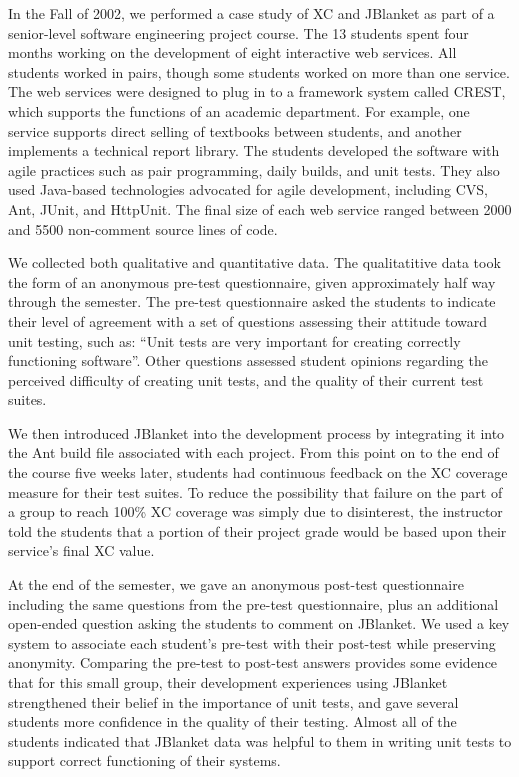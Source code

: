\documentclass[10pt,twocolumn]{article}
\begin{document}
\label{sec:Classroom}

In the Fall of 2002, we performed a case study of XC and JBlanket as part
of a senior-level software engineering project course.  The 13 students
spent four months working on the development of eight interactive web
services. All students worked in pairs, though some students worked on more
than one service. The web services were designed to plug in to a framework
system called CREST, which supports the functions of an academic
department. For example, one service supports direct selling of textbooks
between students, and another implements a technical report library.  The
students developed the software with agile practices such as pair
programming, daily builds, and unit tests. They also used Java-based
technologies advocated for agile development, including CVS, Ant, JUnit,
and HttpUnit. The final size of each web service ranged between 2000 and
5500 non-comment source lines of code.

We collected both qualitative and quantitative data.  The qualitatitive
data took the form of an anonymous pre-test questionnaire, given approximately half
way through the semester.  The pre-test questionnaire asked the students to
indicate their level of agreement with a set of questions assessing their
attitude toward unit testing, such as: ``Unit tests are very important for
creating correctly functioning software''.  Other questions assessed
student opinions regarding the perceived difficulty of creating unit tests,
and the quality of their current test suites.

We then introduced JBlanket into the development process by integrating it
into the Ant build file associated with each project. From this point on to
the end of the course five weeks later, students had continuous feedback on
the XC coverage measure for their test suites.  To reduce the possibility
that failure on the part of a group to reach 100\% XC coverage was simply
due to disinterest, the instructor told the students that a portion of
their project grade would be based upon their service's final XC value.

At the end of the semester, we gave an anonymous post-test questionnaire
including the same questions from the pre-test questionnaire, plus an
additional open-ended question asking the students to comment on
JBlanket. We used a key system to associate each student's pre-test with
their post-test while preserving anonymity.  Comparing the pre-test to
post-test answers provides some evidence that for this small group, their
development experiences using JBlanket strengthened their belief in the
importance of unit tests, and gave several students more confidence in the
quality of their testing. Almost all of the students indicated that
JBlanket data was helpful to them in writing unit tests to support correct
functioning of their systems.
\end{document}
